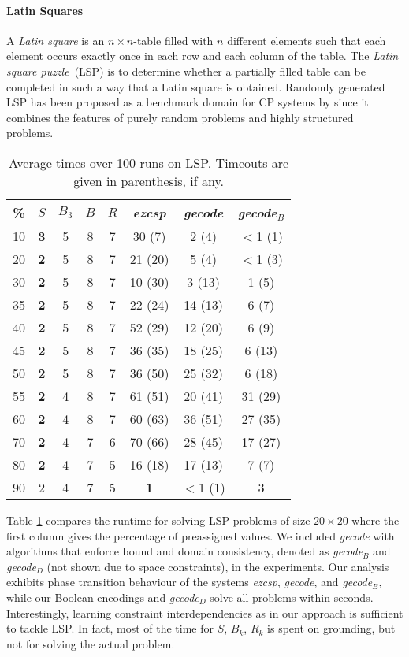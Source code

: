 \documentclass[letterpaper]{article}
\newcommand{\systemname}[1]{\textit{#1}}
\newcommand{\encsup}{$S$}
\newcommand{\encbou}{$B$}
\newcommand{\encran}{$R$}
\newcommand{\encbouh}[1]{\encbou$_{#1}$}
\begin{document}
\paragraph{Latin Squares}
A \emph{Latin square} is an $n \times n$-table filled with $n$ different elements such that each element occurs exactly once in each row and each column of the table. The \emph{Latin square puzzle}~(LSP) is to determine whether a partially filled table can be completed in such a way that a Latin square is obtained.
Randomly generated LSP has been proposed as a benchmark domain for CP systems by \citeauthor{gose97a} since it combines the features of purely random problems and highly structured problems.
\begin{table}
\centering
\begin{tabular}{cccccccc} \hline\hline
\% & \encsup & \encbouh{3} & \encbou & \encran & \systemname{ezcsp} & \systemname{gecode} & \systemname{gecode}$_{B}$ \\ \hline
10 & \textbf{3} & 5 & 8 & 7 &30 (7)  & 2 (4) & $<$1 (1) \\
20 & \textbf{2} & 5 & 8 & 7 &21 (20) & 5 (4) & $<$1 (3) \\
30 & \textbf{2} & 5 & 8 & 7 &10 (30) & 3 (13) & 1 (5) \\
35 & \textbf{2} & 5 & 8 & 7 &22 (24) &14 (13) & 6 (7) \\
40 & \textbf{2} & 5 & 8 & 7 &52 (29) &12 (20) & 6 (9) \\
45 & \textbf{2} & 5 & 8 & 7 &36 (35) &18 (25) & 6 (13) \\
50 & \textbf{2} & 5 & 8 & 7 &36 (50) &25 (32) & 6 (18) \\
55 & \textbf{2} & 4 & 8 & 7 &61 (51) &20 (41) &31 (29) \\
60 & \textbf{2} & 4 & 8 & 7 &60 (63) &36 (51) &27 (35) \\
70 & \textbf{2} & 4 & 7 & 6 &70 (66) &28 (45) &17 (27) \\
80 & \textbf{2} & 4 & 7 & 5 &16 (18) &17 (13) & 7 (7) \\
90 & 2 & 4 & 7 & 5 & \textbf{1} & $<$1 (1) & 3 \\ \hline\hline
\end{tabular}
\caption{Average times over 100 runs on LSP. Timeouts are given in parenthesis, if any.\label{tab:qcp}}
\vspace{-1\baselineskip}
\end{table}
Table \ref{tab:qcp} compares the runtime for solving LSP problems of size $20 \times 20$ where the first column gives the percentage of preassigned values. We included \systemname{gecode} with algorithms that enforce bound and domain consistency, denoted as \systemname{gecode}$_{B}$ and \systemname{gecode}$_{D}$ (not shown due to space constraints), in the experiments. Our analysis exhibits phase transition behaviour of the systems \systemname{ezcsp}, \systemname{gecode}, and \systemname{gecode}$_{B}$, while our Boolean encodings and \systemname{gecode}$_{D}$ solve all problems within seconds. Interestingly, learning constraint interdependencies as in our approach is sufficient to tackle LSP. In fact, most of the time for $S$, $B_k$, $R_k$ is spent on grounding, but not for solving the actual problem.
\end{document}
